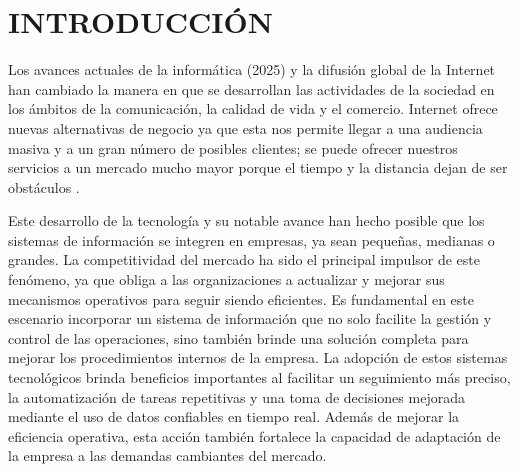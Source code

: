 \chapter{INTRODUCCIÓN}

	\vspace{10pt}

	Los avances actuales de la informática (2025) y la difusión global de la Internet han cambiado la manera en que se desarrollan las actividades de la sociedad en los ámbitos de la comunicación, la calidad de vida y el comercio. Internet ofrece nuevas alternativas de negocio ya que esta nos permite llegar a una audiencia masiva y a un gran número de posibles clientes; se puede ofrecer nuestros servicios a un mercado mucho mayor porque el tiempo y la distancia dejan de ser obstáculos \parencite{anormaliza2009implementacion}.
	
	
	Este desarrollo de la tecnología y su notable avance han hecho posible que los sistemas de información se integren en empresas, ya sean pequeñas, medianas o grandes. La competitividad del mercado ha sido el principal impulsor de este fenómeno, ya que obliga a las organizaciones a actualizar y mejorar sus mecanismos operativos para seguir siendo eficientes. Es fundamental en este escenario incorporar un sistema de información que no solo facilite la gestión y control de las operaciones, sino también brinde una solución completa para mejorar los procedimientos internos de la empresa. La adopción de estos sistemas tecnológicos brinda beneficios importantes al facilitar un seguimiento más preciso, la automatización de tareas repetitivas y una toma de decisiones mejorada mediante el uso de datos confiables en tiempo real. Además de mejorar la eficiencia operativa, esta acción también fortalece la capacidad de adaptación de la empresa a las demandas cambiantes del mercado.
	
